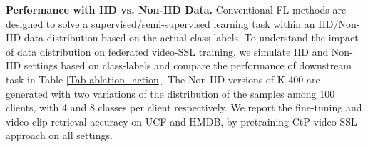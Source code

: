 \begin{table}[t]
    \caption{\small Action recognition and video clip retrieval accuracies (\%) on UCF and HMDB for the federated CtP models pretrained with one local epoch per round. C represents the number of clients, and Cpc stands for the number of classes per client} 
    \label{Tab-ablation_action}
    \centering
\end{table}

\noindent \textbf{Performance with IID vs. Non-IID Data.} Conventional FL methods are designed to solve a supervised/semi-supervised learning task within an IID/Non-IID data distribution based on the actual class-labels. 
To understand the impact of data distribution on federated video-SSL training, we simulate IID and Non-IID settings based on class-labels and compare the performance of downstream task in Table \ref{Tab-ablation_action}. 
The Non-IID versions of K-400 are generated with two variations of the distribution of the samples among 100 clients, with 4 and 8 classes per client respectively.
We report the fine-tuning and video clip retrieval accuracy on UCF and HMDB, by pretraining CtP video-SSL approach on all settings.

